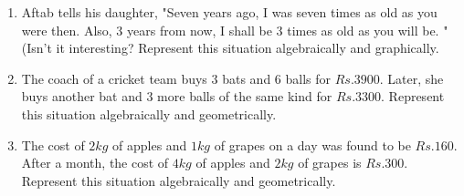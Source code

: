 \begin{enumerate}
\item Aftab tells his daughter, "Seven years ago, I was seven times as old as you were then. Also, $3$ years from now, I shall be $3$ times as old as  you will be. "(Isn't it interesting? Represent this situation algebraically and graphically.
\item The coach of a cricket team buys $3$ bats and $6$ balls for $Rs.3900$. Later, she buys another bat and $3$ more balls of the same kind for $Rs.3300$. Represent this situation algebraically and geometrically.
\item The cost of $2kg$ of apples and $1kg$ of grapes on a day was found to be $Rs.160$. After a month, the cost of $4kg$ of apples and $2kg$ of grapes is $Rs.300$. Represent this situation algebraically and geometrically.
\end{enumerate}
